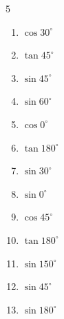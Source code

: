 \begin{multicols}{5}
\begin{enumerate}
  \item $\displaystyle \cos{30^\circ}$


  \item $\displaystyle \tan{45^\circ}$

        \phantom{$\displaystyle =1$}

  \item $\displaystyle \sin{45^\circ}$


  \item $\displaystyle \sin{60^\circ}$


  \item $\displaystyle \cos{0^\circ}$

        \phantom{$\displaystyle =1$}

  \item $\displaystyle \tan{180^\circ}$

        \phantom{$\displaystyle =0$}

  \item $\displaystyle \sin{30^\circ}$


  \item $\displaystyle \sin{0^\circ}$

        \phantom{$\displaystyle =0$}

  \item $\displaystyle \cos{45^\circ}$


  \item $\displaystyle \tan{180^\circ}$

        \phantom{$\displaystyle =0$}

\columnbreak %

  \item $\displaystyle \sin{150^\circ}$


  \item $\displaystyle \sin{45^\circ}$


  \item $\displaystyle \sin{180^\circ}$


\end{enumerate}
\end{multicols}
